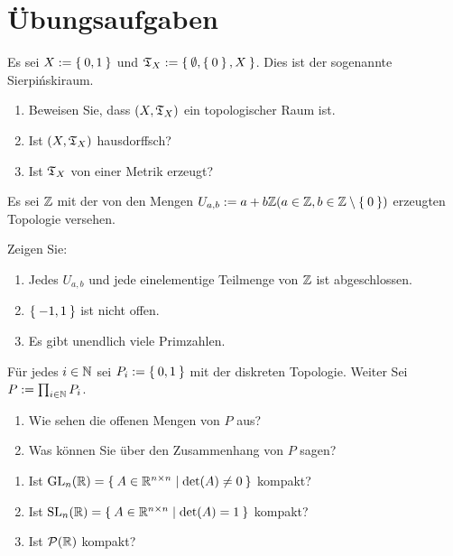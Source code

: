 \clearpage
\section*{Übungsaufgaben}

\begin{aufgabe}[Sierpińskiraum]\label{ub1:aufg1}
    Es sei $X := \Set{0,1}$ und $\mathfrak{T}_X := \Set{\emptyset, \Set{0}, X}$.
    Dies ist der sogenannte Sierpińskiraum.
    \begin{enumerate}[label=(\alph*)]
        \item Beweisen Sie, dass $(X, \mathfrak{T}_X)$ ein topologischer Raum ist.
        \item Ist $(X, \mathfrak{T}_X)$ hausdorffsch?
        \item Ist $\mathfrak{T}_X$ von einer Metrik erzeugt?
    \end{enumerate}
\end{aufgabe}

\begin{aufgabe}\label{ub1:aufg4}
    Es sei $\mathbb{Z}$ mit der von den Mengen $U_{a,b} := a + b \mathbb{Z} (a \in \mathbb{Z}, b \in \mathbb{Z} \setminus \Set{0})$
    erzeugten Topologie versehen.

    Zeigen Sie:
    \begin{enumerate}[label=(\alph*)]
        \item Jedes $U_{a,b}$ und jede einelementige Teilmenge von $\mathbb{Z}$ ist abgeschlossen.
        \item $\Set{-1, 1}$ ist nicht offen.
        \item Es gibt unendlich viele Primzahlen.
    \end{enumerate}
\end{aufgabe}

\begin{aufgabe}\label{ub2:aufg4}
    Für jedes $i \in \mathbb{N}$ sei $P_i := \Set{0,1}$ mit der diskreten
    Topologie. Weiter Sei $P := \prod_{i \in \mathbb{N}} P_i$.

    \begin{enumerate}[label=(\alph*)]
        \item Wie sehen die offenen Mengen von $P$ aus?
        \item Was können Sie über den Zusammenhang von $P$ sagen?
    \end{enumerate}
\end{aufgabe}

\begin{aufgabe}[Kompaktheit]\label{ub3:aufg1}
    \begin{enumerate}[label=(\alph*)]
        \item Ist $\text{GL}_n(\mathbb{R}) = \Set{A \in \ensuremath{\mathbb{R}}^{n \times n} | \det(A) \neq 0}$ kompakt?
        \item Ist $\text{SL}_n(\mathbb{R}) = \Set{A \in \ensuremath{\mathbb{R}}^{n \times n} | \det(A) = 1}$ kompakt?
        \item Ist $\mathcal{P}(\mathbb{R})$ kompakt?
    \end{enumerate}
\end{aufgabe}

